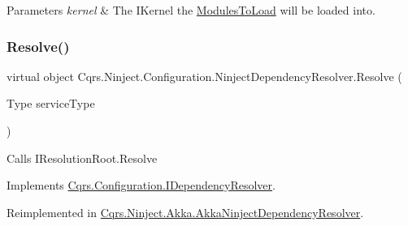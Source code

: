 \begin{DoxyParams}{Parameters}
{\em kernel} & The I\+Kernel the \hyperlink{classCqrs_1_1Ninject_1_1Configuration_1_1NinjectDependencyResolver_a45264a8fae5380727d1af41bc2155381}{Modules\+To\+Load} will be loaded into.\\
\hline
\end{DoxyParams}
\mbox{\label{classCqrs_1_1Ninject_1_1Configuration_1_1NinjectDependencyResolver_aef2a2be58a2562a349572e9946cd2930}} 
\subsubsection{\texorpdfstring{Resolve()}{Resolve()}}
{\footnotesize\ttfamily virtual object Cqrs.\+Ninject.\+Configuration.\+Ninject\+Dependency\+Resolver.\+Resolve (\begin{DoxyParamCaption}\item[{Type}]{service\+Type }\end{DoxyParamCaption})\hspace{0.3cm}{\ttfamily [virtual]}}



Calls I\+Resolution\+Root.\+Resolve 



Implements \hyperlink{interfaceCqrs_1_1Configuration_1_1IDependencyResolver_aa455096b7b94fc1d64904bc67830ec06}{Cqrs.\+Configuration.\+I\+Dependency\+Resolver}.



Reimplemented in \hyperlink{classCqrs_1_1Ninject_1_1Akka_1_1AkkaNinjectDependencyResolver_adace29de71f10e34e952bd41e48106a6}{Cqrs.\+Ninject.\+Akka.\+Akka\+Ninject\+Dependency\+Resolver}.

\mbox{\label{classCqrs_1_1Ninject_1_1Configuration_1_1NinjectDependencyResolver_a35cbb03e98326a3d10ba86c427148b3c}} 
